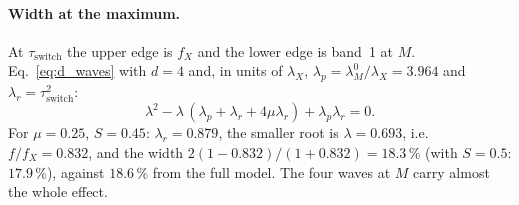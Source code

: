 \paragraph{Width at the maximum.} At $\tau_\text{switch}$ the upper edge is $f_X$ and
the lower edge is band~1 at $M$. Eq.~\eqref{eq:d_waves} with $d = 4$ and, in units of
$\lambda_X$, $\lambda_p = \lambda_M^0/\lambda_X = 3.964$ and
$\lambda_r = \tau_\text{switch}^2$:
\begin{equation}
  \lambda^2 - \lambda\,(\lambda_p + \lambda_r + 4\mu\lambda_r) + \lambda_p\lambda_r = 0 .
\end{equation}
For $\mu = 0.25$, $S = 0.45$: $\lambda_r = 0.879$, the smaller root is
$\lambda = 0.693$, i.e.\ $f/f_X = 0.832$, and the width
$2(1 - 0.832)/(1 + 0.832) = 18.3\,\%$ (with $S = 0.5$: $17.9\,\%$), against
$18.6\,\%$ from the full model. The four waves at $M$ carry almost the whole effect.

